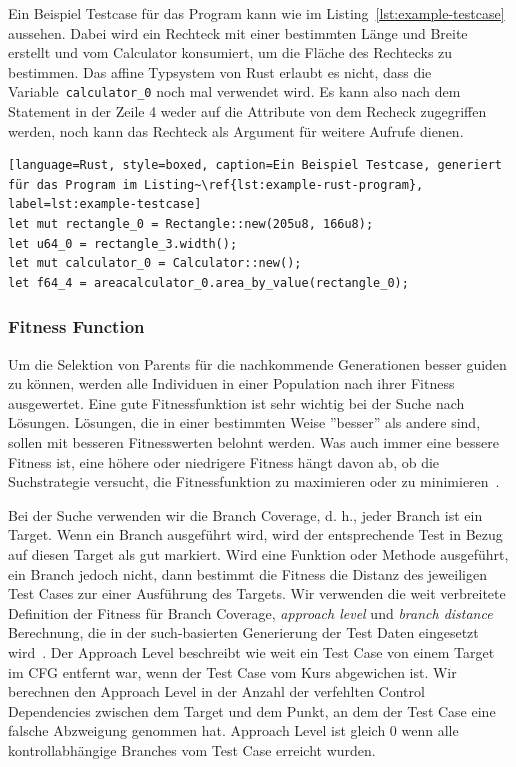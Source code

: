 \documentclass{article}
\begin{document}
Ein Beispiel Testcase für das Program kann wie im Listing~\ref{lst:example-testcase} aussehen. Dabei wird ein Rechteck mit einer bestimmten Länge und Breite erstellt und vom Calculator konsumiert, um die Fläche des Rechtecks zu bestimmen. Das affine Typsystem von Rust erlaubt es nicht, dass die Variable~\lstinline{calculator_0} noch mal verwendet wird. Es kann also nach dem Statement in der Zeile 4 weder auf die Attribute von dem Recheck zugegriffen werden, noch kann das Rechteck als Argument für weitere Aufrufe dienen.

\begin{lstlisting}[language=Rust, style=boxed, caption=Ein Beispiel Testcase, generiert für das Program im Listing~\ref{lst:example-rust-program}, label=lst:example-testcase]
let mut rectangle_0 = Rectangle::new(205u8, 166u8);
let u64_0 = rectangle_3.width();
let mut calculator_0 = Calculator::new();
let f64_4 = areacalculator_0.area_by_value(rectangle_0);
\end{lstlisting}


\subsubsection{Fitness Function}
Um die Selektion von Parents für die nachkommende Generationen besser guiden zu können, werden alle Individuen in einer Population nach ihrer Fitness ausgewertet. Eine gute Fitnessfunktion ist sehr wichtig bei der Suche nach Lösungen. Lösungen, die in einer bestimmten Weise ''besser'' als andere sind, sollen mit besseren Fitnesswerten belohnt werden. Was auch immer eine bessere Fitness ist, eine höhere oder niedrigere Fitness hängt davon ab, ob die Suchstrategie versucht, die Fitnessfunktion zu maximieren oder zu minimieren~\cite{McMinn_2004}.

Bei der Suche verwenden wir die Branch Coverage, d. h., jeder Branch ist ein Target. Wenn ein Branch ausgeführt wird, wird der entsprechende Test in Bezug auf diesen Target als gut markiert. Wird eine Funktion oder Methode ausgeführt, ein Branch jedoch nicht, dann bestimmt die Fitness die Distanz des jeweiligen Test Cases zur einer Ausführung des Targets. Wir verwenden die weit verbreitete Definition der Fitness für Branch Coverage, \textit{approach level} und \textit{branch distance} Berechnung, die in der such-basierten Generierung der Test Daten eingesetzt wird~\cite{McMinn_2004}. Der Approach Level beschreibt wie weit ein Test Case von einem Target im \ac{CFG} entfernt war, wenn der Test Case vom Kurs abgewichen ist. Wir berechnen den Approach Level in der Anzahl der verfehlten Control Dependencies zwischen dem Target und dem Punkt, an dem der Test Case eine falsche Abzweigung genommen hat. Approach Level ist gleich 0 wenn alle kontrollabhängige Branches vom Test Case erreicht wurden.
\end{document}
